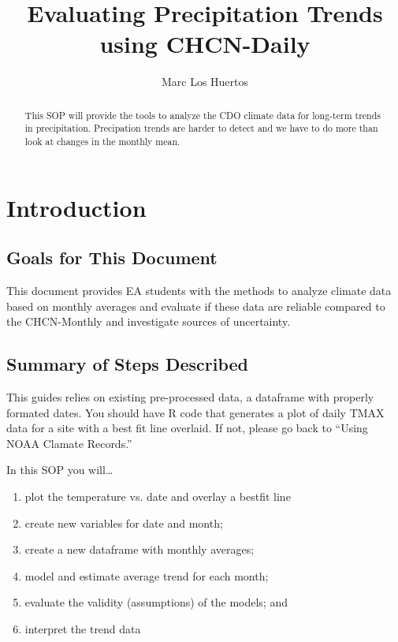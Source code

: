\documentclass{article}\usepackage[]{graphicx}\usepackage[]{color}
\title{Evaluating Precipitation Trends using CHCN-Daily}
\author{Marc Los Huertos}
\begin{document}
\maketitle
\tableofcontents

\begin{abstract}
\noindent This SOP will provide the tools to analyze the CDO climate data for long-term trends in precipitation. Precipation trends are harder to detect and we have to do more than look at changes in the monthly mean.    

\end{abstract}

\section{Introduction}

\subsection{Goals for This Document}

This document provides EA students with the methods to analyze climate data based on monthly averages and evaluate if these data are reliable compared to the CHCN-Monthly and investigate sources of uncertainty.

\subsection{Summary of Steps Described}

This guides relies on existing pre-processed data, a dataframe with properly formated dates. You should have R code that generates a plot of daily TMAX data for a site with a best fit line overlaid. If not, please go back to ``Using NOAA Clamate Records.''

In this SOP you will\ldots

\begin{enumerate}
  \item plot the temperature vs. date and overlay a bestfit line
  \item create new variables for date and month;
  \item create a new dataframe with monthly averages;
  \item model and estimate average trend for each month;
  \item evaluate the validity (assumptions) of the models; and
  \item interpret the trend data
\end{enumerate}
\end{document}
